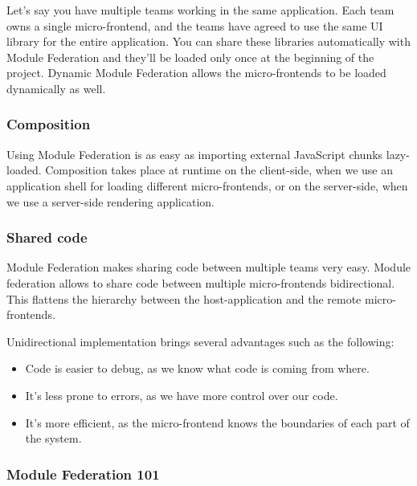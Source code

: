 Let's say you have multiple teams working in the same application. Each team owns a single micro-frontend, and the teams have agreed to use the same UI library for the entire application. You can share these libraries automatically with Module Federation and they'll be loaded only once at the beginning of the project. Dynamic Module Federation allows the micro-frontends to be loaded dynamically as well. \cite[83]{book:2021:mezzalira:applied-methods:building-micro-frontends}

\subsubsection{Composition}

Using Module Federation is as easy as importing external JavaScript chunks lazy-loaded. Composition takes place at runtime on the client-side, when we use an application shell for loading different micro-frontends, or on the server-side, when we use a server-side rendering application. \cite[84]{book:2021:mezzalira:applied-methods:building-micro-frontends}

\subsubsection{Shared code}

Module Federation makes sharing code between multiple teams very easy. Module federation allows to share code between multiple micro-frontends bidirectional. This flattens the hierarchy between the host-application and the remote micro-frontends.

Unidirectional implementation brings several advantages such as the following: \cite[84]{book:2021:mezzalira:applied-methods:building-micro-frontends}

\begin{itemize}
    \item Code is easier to debug, as we know what code is coming from where.
    \item It's less prone to errors, as we have more control over our code.
    \item It's more efficient, as the micro-frontend knows the boundaries of each part of the system.
\end{itemize}

\subsubsection{Module Federation 101}

